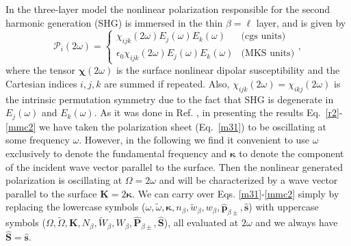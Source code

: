 \documentclass[10pt]{book}
\begin{document}
In the three-layer model the nonlinear polarization responsible for 
the second harmonic generation (SHG) is immersed in the thin $\beta=\ell$
layer, and is given by 
\begin{equation}\label{tres}
\mathcal{P}_i(2\omega)=
\left\{
\begin{array}{cc}
\chi_{ijk}(2\omega)E_{j}(\omega)E_{k}(\omega) & \text{(cgs units)} \\
\epsilon_{0}\chi_{ijk}(2\omega)E_{j}(\omega)E_{k}(\omega) & \text{(MKS units)}
\end{array}
\right.
,
\end{equation}
where the  
tensor $\boldsymbol{\chi}(2\omega)$ is the surface nonlinear  
dipolar susceptibility and the Cartesian indices $i,j,k$ are summed if repeated. 
Also, $\chi_{ijk}(2\omega)=\chi_{ikj}(2\omega)$ 
is the intrinsic permutation symmetry
due to the fact that SHG is degenerate in $E_j(\omega)$ and $E_k(\omega)$.
As it was done in Ref. \cite{mizrahiJOSA88},
in presenting the results Eq.~\eqref{r2}-\eqref{mmc2}
we have taken the
polarization sheet (Eq.~\eqref{m31}) to be oscillating at some frequency
$\omega$. However,
 in the following we find it convenient to use $\omega$
exclusively to denote the fundamental frequency and
$\boldsymbol{\kappa}$
 to denote the
component of the incident wave vector parallel to the surface. Then
the nonlinear 
generated polarization is oscillating at $\Omega= 2\omega$
and will be characterized
by a wave vector parallel to the surface 
$\mathbf{K}=2\boldsymbol{\kappa}$. 
We can carry over
Eqs. \eqref{m31}-\eqref{mmc2} 
simply by replacing the lowercase symbols 
($\omega,\tilde\omega,\boldsymbol{\kappa},n_\beta,\tilde w_\beta,w_\beta,\hat{\mathbf{p}}_{\beta\pm},\hat{\mathbf{s}}$)  
with uppercase symbols 
($\Omega,\tilde\Omega,\mathbf{K},N_\beta,\tilde W_\beta,W_\beta,\hat{\mathbf{P}}_{\beta\pm},\hat{\mathbf{S}}$),
all evaluated at $2\omega$ and
we always have $\hat{\mathbf{S}}=\hat{\mathbf{s}}$.
\end{document}
